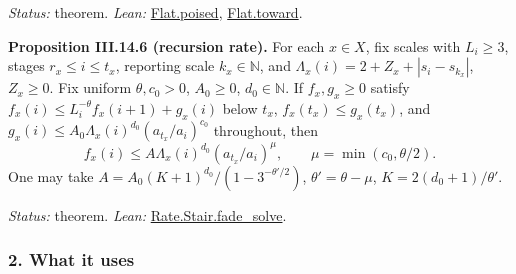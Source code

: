 \documentclass[
  letterpaper,
  11pt]{article}
\begin{document}
\emph{Status:} theorem. \emph{Lean:}
\href{https://github.com/yang-mills-group/OpenAI-YM-20261028/blob/3456e5e75cf8d4cd558955a5c7638fba2d68f464/YM/RG08/Packets/FlatStep.lean\#L24-L38}{Flat.poised},
\href{https://github.com/yang-mills-group/OpenAI-YM-20261028/blob/3456e5e75cf8d4cd558955a5c7638fba2d68f464/YM/RG08/Packets/FlatStep.lean\#L50-L78}{Flat.toward}.

\textbf{Proposition III.14.6 (recursion rate).} For each \(x\in X\), fix
scales with \(L_i\ge3\), stages \(r_x\le i\le t_x\), reporting scale
\(k_x\in\mathbb N\), and \(\Lambda_x(i)=2+Z_x+|s_i-s_{k_x}|\),
\(Z_x\ge0\). Fix uniform \(\theta,c_0>0\), \(A_0\ge0\),
\(d_0\in\mathbb N\). If \(f_x,g_x\ge0\) satisfy
\(f_x(i)\le L_i^{-\theta}f_x(i+1)+g_x(i)\) below \(t_x\),
\(f_x(t_x)\le g_x(t_x)\), and
\(g_x(i)\le A_0\Lambda_x(i)^{d_0}(a_{t_x}/a_i)^{c_0}\) throughout, then
\[f_x(i)\le A\Lambda_x(i)^{d_0}(a_{t_x}/a_i)^\mu,\qquad \mu=\min(c_0,\theta/2).\]
One may take \(A=A_0(K+1)^{d_0}/(1-3^{-\theta'/2})\),
\(\theta'=\theta-\mu\), \(K=2(d_0+1)/\theta'\).

\emph{Status:} theorem. \emph{Lean:}
\href{https://github.com/yang-mills-group/OpenAI-YM-20261028/blob/3456e5e75cf8d4cd558955a5c7638fba2d68f464/YM/RG08/Rate/Ascent.lean\#L118-L134}{Rate.Stair.fade\_solve}.

\subsubsection{2. What it uses}\label{what-it-uses-16}
\end{document}
